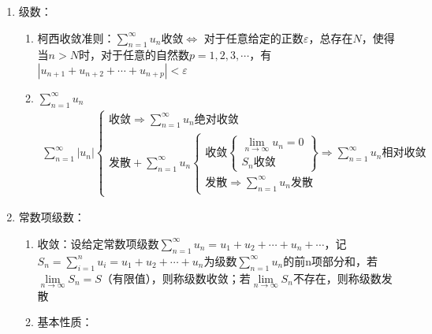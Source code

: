 \documentclass[12pt]{book}
\begin{document}
\begin{enumerate}[1.]
    \item 级数：
          \begin{enumerate}[(1)]
              \item 柯西收敛准则：$\sum_{n=1}^{\infty}{u_n}$收敛$\Leftrightarrow$ 对于任意给定的正数$\varepsilon$，总存在$N$，使得当$n>N$时，对于任意的自然数$p=1,2,3,\cdots$，有$|u_{n+1}+u_{n+2}+\cdots+u_{n+p}|<\varepsilon$
              \item $\sum_{n=1}^{\infty}{u_n}$
              \begin{gather*}
                \sum_{n=1}^{\infty}{|u_n|} 
                \begin{cases}
                    \text{收敛}\Rightarrow \sum_{n=1}^{\infty}{u_n}\text{绝对收敛}\\
                    \text{发散}+\sum_{n=1}^{\infty}{u_n}\begin{cases}
                         \text{收敛}\left.\begin{cases}
                            \lim\limits_{n\rightarrow\infty}{u_n}=0 \\
                            S_n\text{收敛}
                        \end{cases}\right\}\Rightarrow \sum_{n=1}^{\infty}{u_n}\text{相对收敛} \\
                        \text{发散}\Rightarrow \sum_{n=1}^{\infty}{u_n}\text{发散}
                    \end{cases}
                \end{cases} 
              \end{gather*}
          \end{enumerate}
    \item 常数项级数：
          \begin{enumerate}[(1)]
              \item 收敛：设给定常数项级数$\sum_{n=1}^{\infty}{u_n} = u_{1}+u_{2}+\cdots+u_{n}+\cdots$，记$S_n=\sum_{i=1}^{n}{u_i} = u_{1}+u_{2}+\cdots+u_{n}$为级数$\sum_{n=1}^{\infty}{u_n}$的前n项部分和，若$\lim\limits_{n\rightarrow\infty}{S_n}=S$（有限值），则称级数收敛；若$\lim\limits_{n\rightarrow\infty}{S_n}$不存在，则称级数发散
              \item 基本性质：
                    \begin{enumerate}[a.]

\end{enumerate}
\end{enumerate}
\end{enumerate}
\end{document}
